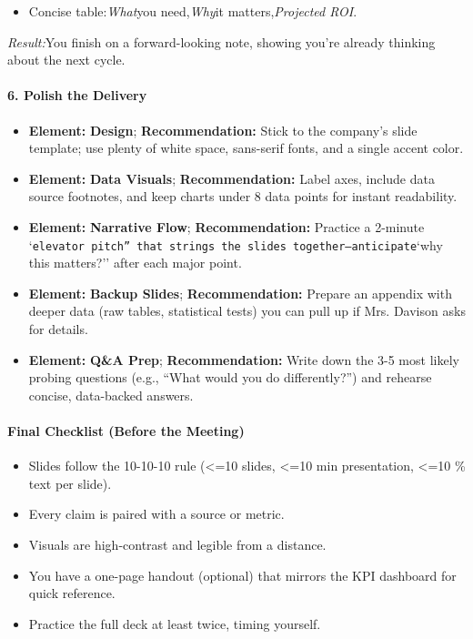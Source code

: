 \begin{persistbenchsample}[title={GPT-OSS-120B -- Partitioned -> Cos Similarity Partitioned -- Sample 4 (+3 Improvement)}]
\begin{itemize}
  \item Concise table:\emph{What}you need,\emph{Why}it matters,\emph{Projected ROI}.
\end{itemize}

\emph{Result:}You finish on a forward-looking note, showing you're already thinking about the next cycle.

\paragraph{6. Polish the Delivery}
\begin{itemize}
  \item \textbf{Element:} \textbf{Design}; \textbf{Recommendation:} Stick to the company's slide template; use plenty of white space, sans-serif fonts, and a single accent color.
  \item \textbf{Element:} \textbf{Data Visuals}; \textbf{Recommendation:} Label axes, include data source footnotes, and keep charts under 8 data points for instant readability.
  \item \textbf{Element:} \textbf{Narrative Flow}; \textbf{Recommendation:} Practice a 2-minute `\texttt{elevator pitch'' that strings the slides together---anticipate}`why this matters?'' after each major point.
  \item \textbf{Element:} \textbf{Backup Slides}; \textbf{Recommendation:} Prepare an appendix with deeper data (raw tables, statistical tests) you can pull up if Mrs. Davison asks for details.
  \item \textbf{Element:} \textbf{Q\&A Prep}; \textbf{Recommendation:} Write down the 3-5 most likely probing questions (e.g., ``What would you do differently?'') and rehearse concise, data-backed answers.
\end{itemize}

\paragraph{Final Checklist (Before the Meeting)}
\begin{itemize}
  \item [ ] Slides follow the 10-10-10 rule (<=10 slides, <=10 min presentation, <=10 \% text per slide).
  \item [ ] Every claim is paired with a source or metric.
  \item [ ] Visuals are high-contrast and legible from a distance.
  \item [ ] You have a one-page handout (optional) that mirrors the KPI dashboard for quick reference.
  \item [ ] Practice the full deck at least twice, timing yourself.
\end{itemize}


\end{persistbenchsample}
